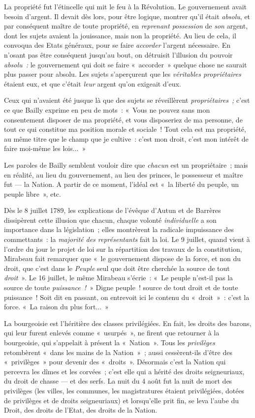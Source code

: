 \documentclass[french,twoside]{book} %
\begin{document}
La propriété fut l’étincelle qui mit le feu à la Révolution. Le gouvernement avait besoin d’argent. Il devait dès lors, pour être logique, montrer qu’il était \emph{absolu}, et par conséquent maître de toute propriété, en \emph{reprenant possession} de \emph{son} argent, dont les sujets avaient la jouissance, mais non la propriété. Au lieu de cela, il convoqua des Etats généraux, pour se  faire \emph{accorder} l’argent nécessaire. En n’osant pas être conséquent jusqu’au bout, on détruisit l’illusion du pouvoir \emph{absolu :} le gouvernement qui doit se faire « accorder » quelque chose ne saurait plus passer pour absolu. Les sujets s’aperçurent que les \emph{véritables propriétaires} étaient eux, et que c’était \emph{leur} argent qu’on exigeait d’eux.\par
Ceux qui n’avaient été jusque là que des sujets se réveillèrent \emph{propriétaires ;} c’est ce que Bailly exprime en peu de mots : « Vous ne pouvez sans mon consentement disposer de ma propriété, et vous disposeriez de ma personne, de tout ce qui constitue ma position morale et sociale ! Tout cela est ma propriété, au même titre que le champ que je cultive : c’est mon droit, c’est mon intérêt de faire moi-même les lois... »\par
Les paroles de Bailly semblent vouloir dire que \emph{chacun} est un propriétaire ; mais en réalité, au lieu du gouvernement, au lieu des princes, le possesseur et maître fut — la Nation. A partir de ce moment, l’idéal est « la liberté du peuple, un peuple libre », etc.\par
Dès le 8 juillet 1789, les explications de l’évêque d’Autun et de Barrères dissipèrent cette illusion que chacun, chaque volonté \emph{individuelle} a son importance dans la législation ; elles montrèrent la radicale impuissance des commettants : la \emph{majorité des représentants} fait la loi. Le 9 juillet, quand vient à l’ordre du jour le projet de loi sur la répartition des travaux de la constitution, Mirabeau fait remarquer que « le gouvernement dispose de la force, et non du droit, que c’est dans le \emph{Peuple} seul que doit être cherchée la source de tout \emph{droit} ». Le 16 juillet, le même Mirabeau s’écrie : « Le peuple n’est-il pas la source de toute \emph{puissance !} » Digne peuple ! source de tout droit et de toute puissance ! Soit dit en passant, on entrevoit ici le contenu du « droit » : c’est la force. « La raison du plus fort... »\par
La bourgeoisie est l’héritière des classes privilégiées. En fait, les droits des barons, qui leur furent enlevés  comme « usurpés », ne firent que retourner à la bourgeoisie, qui s’appelait à présent la « Nation ». Tous les \emph{privilèges} retombèrent « dans les mains de la Nation » ; aussi cessèrent-ils d’être des « privilèges » pour devenir des « droits ». Désormais c’est la Nation qui percevra les dîmes et les corvées ; c’est elle qui a hérité des droits seigneuriaux, du droit de chasse — et des serfs. La nuit du 4 août fut la nuit de mort des privilèges (les villes, les communes, les magistratures étaient privilégiées, dotées de privilèges et de droits seigneuriaux) et lorsqu’elle prit fin, se leva l’aube du Droit, des droits de l’Etat, des droits de la Nation.\par
\end{document}

